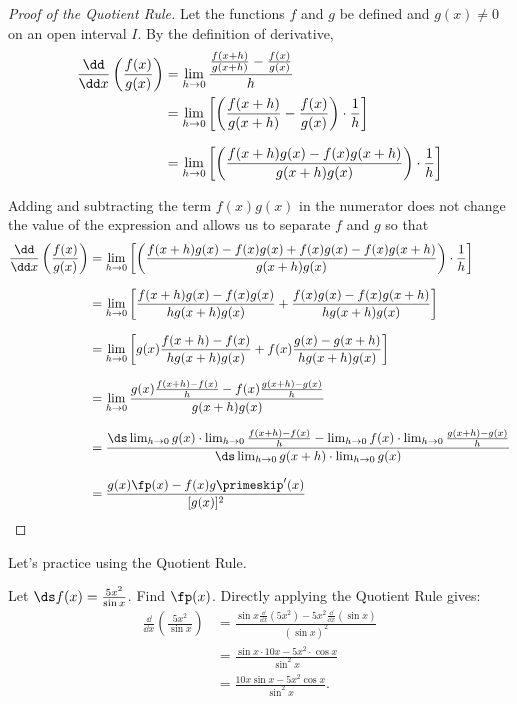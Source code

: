 \begin{proof}[Proof of the Quotient Rule]
Let the functions $f$ and $g$ be defined and $g(x) \neq 0$ on an open interval $I$. By the definition of derivative,
\begin{align*}
\frac{\dd}{\dd x}\left(\frac {f(x)}{g(x)}\right)
&=\lim_{h\to 0}\frac{\frac{f(x+h)}{g(x+h)}-\frac{f(x)}{g(x)}}{h} \\
&=\lim_{h\to 0}
\left[\left(\frac{f(x+h)}{g(x+h)}-\frac{f(x)}{g(x)}\right)\cdot\frac1h\right]\\[.5\baselineskip]
&=\lim_{h\to 0}
\left[\left(\frac{f(x+h)g(x)-f(x)g(x+h)}{g(x+h)g(x)}\right)\cdot\frac1h\right]
\end{align*}

Adding and subtracting the term $f(x)g(x)$ in the numerator does not change the value of the expression and allows us to separate $f$ and $g$ so that
{\small\allowdisplaybreaks
\begin{align*}
\frac{\dd}{\dd x}\left(\frac{f(x)}{g(x)}\right)
&=\lim_{h\to 0}\left[\left(\frac{f(x+h)g(x)-f(x)g(x)+f(x)g(x)-f(x)g(x+h)}{g(x+h)g(x)}\right)\cdot\frac1h\right] \\[.5\baselineskip]
&=\lim_{h\to 0}\left[\frac{f(x+h)g(x)-f(x)g(x)}{hg(x+h)g(x)}+\frac{f(x)g(x)-f(x)g(x+h)}{hg(x+h)g(x)}\right] \\[.5\baselineskip]
&=\lim_{h\to 0}\left[g(x)\frac{f(x+h)-f(x)}{hg(x+h)g(x)}+f(x)\frac{g(x)-g(x+h)}{hg(x+h)g(x)}\right] \\[.5\baselineskip]
&=\lim_{h\to 0}\frac{g(x)\frac{f(x+h)-f(x)}{h}-f(x)\frac{g(x+h)-g(x)}{h}}{g(x+h)g(x)} \\[.5\baselineskip]
&=\frac{\ds\lim_{h\to 0}g(x)\cdot\lim_{h\to 0}\frac{f(x+h)-f(x)}{h}-\lim_{h\to 0}f(x) \cdot\lim_{h\to 0}\frac{g(x+h) - g(x)}{h}}{\ds\lim_{h\to 0}g(x+h)\cdot\lim_{h\to 0}g(x)} \\[.5\baselineskip]
&=\frac{g(x)\fp(x)-f(x)g\primeskip'(x)}{[g(x)]^2}\qedhere
\end{align*}}
\end{proof}

Let's practice using the Quotient Rule.

\begin{example}\label{ex_quot1}
Let $\ds f(x) = \frac{5x^2}{\sin x}$. Find $\fp(x)$.
\solution
Directly applying the Quotient Rule gives:
\begin{align*}
	\frac{\dd}{\dd x}\left(\frac{5x^2}{\sin x}\right)
	& = \frac{\sin x\frac{\dd}{\dd x}(5x^2)-5x^2\frac{\dd}{\dd x}(\sin x)}{(\sin x)^2} \\
	&= \frac{\sin x\cdot 10x - 5x^2\cdot \cos x}{\sin^2x} \\
	&= \frac{10x\sin x - 5x^2\cos x}{\sin^2 x}.
\end{align*}
\end{example}

